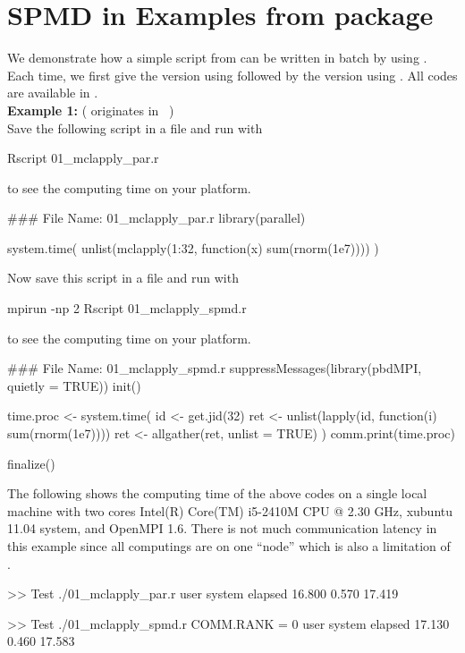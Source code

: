 
\section[SPMD in Examples from package \pkg{parallel}]{SPMD in Examples from package }
\label{sec:analog_examples}

We demonstrate how a simple script from  can be
written in batch by using .  Each time, we first give the
version using  followed by the
version using . All codes are available in
. \\

{\bf Example 1:}
( originates in ~\citep{Urbanek2011}) \\
Save the following script in a file and run with
\begin{Command}
Rscript 01_mclapply_par.r
\end{Command}
to see the computing time on your platform.
\begin{Code}[title=\pkg{multicore} R Script]
### File Name: 01_mclapply_par.r
library(parallel)

system.time(
  unlist(mclapply(1:32, function(x) sum(rnorm(1e7))))
)
\end{Code}
Now save this script in a file and run with
\begin{Command}
mpirun -np 2 Rscript 01_mclapply_spmd.r
\end{Command}
to see the computing time on your platform.
\begin{Code}[title=SPMD R Script]
### File Name: 01_mclapply_spmd.r
suppressMessages(library(pbdMPI, quietly = TRUE))
init()

time.proc <- system.time({
  id <- get.jid(32)
  ret <- unlist(lapply(id, function(i) sum(rnorm(1e7))))
  ret <- allgather(ret, unlist = TRUE)
})
comm.print(time.proc)

finalize()
\end{Code}

The following shows the computing time of the above codes
on a single local machine with two cores
Intel(R) Core(TM) i5-2410M CPU @ 2.30 GHz, xubuntu 11.04 system,
and OpenMPI 1.6. There is not much communication latency in this example
since all computings are on one ``node'' which is also
a limitation of .
\begin{CodeOutput}
>> Test ./01_mclapply_par.r
   user  system elapsed
 16.800   0.570  17.419

>> Test ./01_mclapply_spmd.r
COMM.RANK = 0
   user  system elapsed
 17.130   0.460  17.583
\end{CodeOutput}


